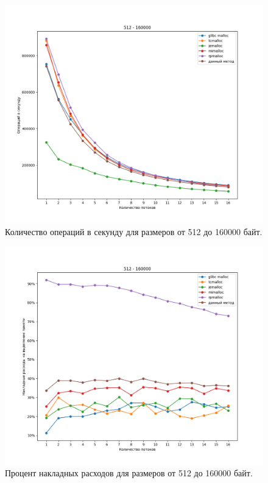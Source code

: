 \begin{figure}[!h]
	\begin{center}
		\includegraphics[width=1.0\linewidth, height=0.37\textheight]{images/512_160000_ops.png}
		\caption{Количество операций в секунду для размеров от 512 до 160000 байт.}
		\label{512_160000_ops}
	\end{center}
\end{figure}

\begin{figure}[!h]
	\begin{center}
		\includegraphics[width=1.0\linewidth, height=0.37\textheight]{images/512_160000_overhead.png}
		\caption{Процент накладных расходов для размеров от 512 до 160000 байт.}
		\label{512_160000_overhead}
	\end{center}
\end{figure}


